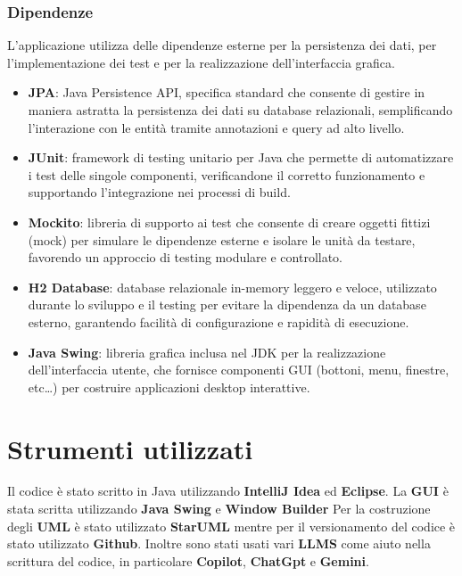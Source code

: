 \subsubsection{Dipendenze}
L'applicazione utilizza delle dipendenze esterne per la persistenza dei dati, 
per l'implementazione dei test e per la realizzazione dell'interfaccia grafica.

\begin{itemize}
    \item \textbf{JPA}: Java Persistence API, specifica standard che consente di gestire in maniera astratta la 
    persistenza dei dati su database relazionali, semplificando l'interazione con le entità tramite annotazioni 
    e query ad alto livello.
    
    \item \textbf{JUnit}: framework di testing unitario per Java che permette di automatizzare i test delle singole
     componenti, verificandone il corretto funzionamento e supportando l'integrazione nei processi di build.
    
    \item \textbf{Mockito}: libreria di supporto ai test che consente di creare oggetti fittizi (mock) per simulare 
    le dipendenze esterne e isolare le unità da testare, favorendo un approccio di testing modulare e controllato.
    
    \item \textbf{H2 Database}: database relazionale in-memory leggero e veloce, utilizzato durante lo sviluppo e il 
    testing per evitare la dipendenza da un database esterno, garantendo facilità di configurazione e rapidità di esecuzione.
    
    \item \textbf{Java Swing}: libreria grafica inclusa nel JDK per la realizzazione dell'interfaccia utente, 
    che fornisce componenti GUI (bottoni, menu, finestre, etc\dots) per costruire applicazioni desktop interattive.

\end{itemize}

\section{Strumenti utilizzati}
Il codice è stato scritto in Java utilizzando \textbf{IntelliJ Idea} ed \textbf{Eclipse}.
La \textbf{GUI} è stata scritta utilizzando \textbf{Java Swing} e \textbf{Window Builder} 
Per la costruzione degli \textbf{UML} è stato utilizzato \textbf{StarUML} mentre per il versionamento
del codice è stato utilizzato \textbf{Github}. Inoltre sono stati usati vari \textbf{LLMS} come 
aiuto nella scrittura del codice, in particolare \textbf{Copilot}, \textbf{ChatGpt} e \textbf{Gemini}.